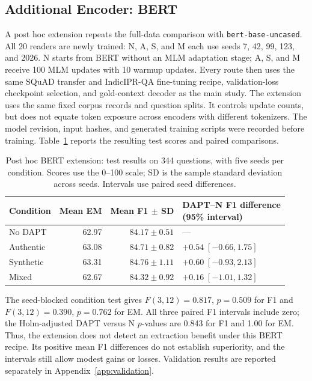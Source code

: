 \documentclass[pdflatex,sn-basic]{sn-jnl}
\begin{document}
\subsection{Additional Encoder: BERT}
\label{sec:bert_extension}

A post hoc extension repeats the full-data comparison with
\texttt{bert-base-uncased}. All 20 readers are newly trained: N, A, S, and M
each use seeds 7, 42, 99, 123, and 2026. N starts from BERT without an MLM
adaptation stage; A, S, and M receive 100 MLM updates with 10 warmup updates.
Every route then uses the same SQuAD transfer and IndicIPR-QA fine-tuning
recipe, validation-loss checkpoint selection, and gold-context decoder as the
main study. The extension uses the same fixed corpus records and question
splits. It controls update counts, but does not equate token exposure across
encoders with different tokenizers. The model revision, input hashes, and
generated training scripts were recorded before training.
Table~\ref{tab:bert_extension_test} reports the resulting test scores and
paired comparisons.

\begin{table}[!htbp]
\caption{Post hoc BERT extension: test results on 344 questions, with five
seeds per condition. Scores use the 0--100 scale; SD is the sample standard
deviation across seeds. Intervals use paired seed differences.}
\label{tab:bert_extension_test}
\centering\scriptsize
\begin{tabular}{@{}lrr>{\raggedright\arraybackslash}p{4.4cm}@{}}
\toprule
Condition & Mean EM & Mean F1 $\pm$ SD & \shortstack[l]{DAPT--N F1 difference\\(95\% interval)} \\
\midrule
No DAPT & 62.97 & $84.17\pm0.51$ & --- \\
Authentic & 63.08 & $84.71\pm0.82$ & $+0.54\;[-0.66,1.75]$ \\
Synthetic & 63.31 & $84.76\pm1.11$ & $+0.60\;[-0.93,2.13]$ \\
Mixed & 62.67 & $84.32\pm0.92$ & $+0.16\;[-1.01,1.32]$ \\
\bottomrule
\end{tabular}
\end{table}

The seed-blocked condition test gives \(F(3,12)=0.817\), \(p=0.509\) for
F1 and \(F(3,12)=0.390\), \(p=0.762\) for EM. All three paired F1
intervals include zero; the Holm-adjusted DAPT versus N \(p\)-values are
0.843 for F1 and 1.00 for EM. Thus, the extension does not detect an
extraction benefit under this BERT recipe. Its positive mean F1 differences
do not establish superiority, and the intervals still allow modest gains or
losses. Validation results are reported separately in
Appendix~\ref{app:validation}.
\end{document}
